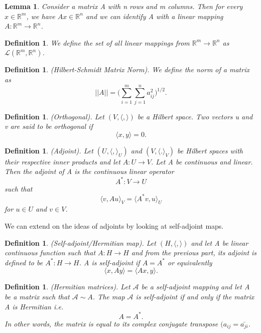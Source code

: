\documentclass[twoside]{article}
\newtheorem{lemma}[theorem]{Lemma}
\newtheorem{definition}[theorem]{Definition}
\begin{document}
\begin{lemma}Consider a matrix A with n rows and m columns. Then for every $x \in \mathbb{R}^m$, we have $Ax \in \mathbb{R}^n$ and we can identify A with a linear mapping $A: \mathbb{R}^m \rightarrow \mathbb{R}^n$. 
\end{lemma}

\begin{definition}We define the set of all linear mappings from $\mathbb{R}^m \rightarrow \mathbb{R}^n$ as $\mathcal{L}(\mathbb{R}^m, \mathbb{R}^n)$.
\end{definition}

\begin{definition}(Hilbert-Schmidt Matrix Norm). We define the norm of a matrix as
$$
||A|| = \big(\sum_{i=1}^m\sum_{j=1}^na_{ij}^2 \big)^{1/2}.
$$
\end{definition}

\begin{definition}(Orthogonal). Let $(V, \langle , \rangle)$ be a Hilbert space. Two vectors u and v are said to be orthogonal if $$\langle x, y \rangle = 0.$$
\end{definition}

\begin{definition}(Adjoint). Let $(U,\langle , \rangle_U)$ and $(V, \langle . \rangle_V)$ be Hilbert spaces with their respective inner products and let $A: U \rightarrow V$. Let A be continuous and linear. Then the adjoint of A is the continuous linear operator $$A^*: V \rightarrow U$$ such that  $$\langle v, Au \rangle_V = \langle A^*v, u\rangle_U $$ for $u \in U$ and $v \in V$.
\end{definition}

We can extend on the ideas of adjoints by looking at self-adjoint maps.

\begin{definition}(Self-adjoint/Hermitian map). Let $(H, \langle , \rangle)$ and let A be linear continuous function such that $A: H \rightarrow H$ and from the previous part, its adjoint is defined to be $A^*: H \rightarrow H$. A is self-adjoint if $A = A^*$ or equivalently 
$$
\langle x, Ay \rangle = \langle Ax, y \rangle.
$$
\end{definition}

\begin{definition}(Hermitian matrices). Let $\mathcal{A}$ be a self-adjoint mapping and let A be a matrix such that $\mathcal{A} \sim A$. The map $\mathcal{A}$ is self-adjoint if and only if the matrix A is Hermitian i.e. 
$$
A = A^*.
$$
In other words, the matrix is equal to its complex conjugate transpose $(a_{ij} = \bar{a_{ji}}$.
\end{definition}
\end{document}
